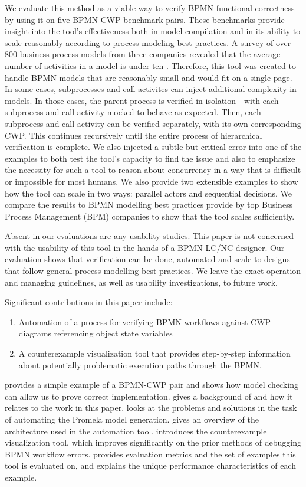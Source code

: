 We evaluate this method as a viable way to verify BPMN functional correctness by using it on five BPMN-CWP benchmark pairs. These benchmarks provide insight into the tool's effectiveness both in model compilation and in its ability to scale reasonably according to process modeling best practices. A survey of over 800 business process models from three companies revealed that the average number of activities in a model is under ten \cite{BPMSizes}. Therefore, this tool was created to handle BPMN models that are reasonably small and would fit on a single page. In some cases, subprocesses and call activites can inject additional complexity in models. In those cases, the parent process is verified in isolation - with each subprocess and call activity mocked to behave as expected. Then, each subprocess and call activity can be verified separately, with its own corresponding CWP. This continues recursively until the entire process of hierarchical verification is complete. We also injected a subtle-but-critical error into one of the examples to both test the tool's capacity to find the issue and also to emphasize the necessity for such a tool to reason about concurrency in a way that is difficult or impossible for most humans. We also provide two extensible examples to show how the tool can scale in two ways: parallel actors and sequential decisions. We compare the results to BPMN modelling best practices provide by top Business Process Management (BPM) companies to show that the tool scales sufficiently.

Absent in our evaluations are any usability studies. This paper is not concerned with the usability of this tool in the hands of a BPMN LC/NC designer. Our evaluation shows that verification can be done, automated and scale to designs that follow general process modelling best practices. We leave the exact operation and managing guidelines, as well as usability investigations, to future work.

Significant contributions in this paper include:
\begin{enumerate}
    \item Automation of a process for verifying BPMN workflows against CWP diagrams referencing object state variables
    \item A counterexample visualization tool that provides step-by-step information about potentially problematic execution paths through the BPMN.
\end{enumerate}

 provides a simple example of a BPMN-CWP pair and shows how model checking can allow us to prove correct implementation.
 gives a background of \cite{mercer22} and how it relates to the work in this paper.
 looks at the problems and solutions in the task of automating the Promela model generation.
 gives an overview of the architecture used in the automation tool.
 introduces the counterexample visualization tool, which improves significantly on the prior methods of debugging BPMN workflow errors.
 provides evaluation metrics and the set of examples this tool is evaluated on, and explains the unique performance characteristics of each example.